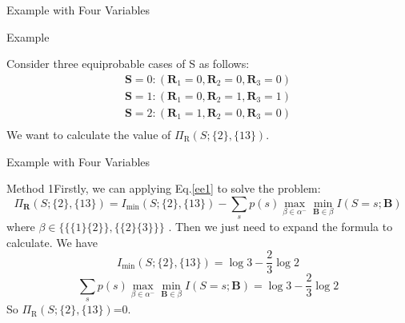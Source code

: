 \begin{frame}{Example with Four Variables}
\begin{block}{Example}

 Consider three equiprobable cases of S as follows:
\[
\begin{array}{c}
\mathbf{S}=0: (\mathbf{R}_1=0,\mathbf{R}_2=0,\mathbf{R}_3=0)\\
\mathbf{S}=1: (\mathbf{R}_1=0,\mathbf{R}_2=1,\mathbf{R}_3=1)\\
\mathbf{S}=2: (\mathbf{R}_1=1,\mathbf{R}_2=0,\mathbf{R}_3=0)\\
\end{array}
\]
We want to calculate the value of $\Pi_{\mathrm{R}}(S ; \{2\},\{13\})$.
\end{block}

\end{frame}
\begin{frame}{Example with Four Variables}
\begin{block}{Method 1}Firstly, we can applying Eq.\ref{ee1}  to solve the problem:
\begin{equation}\Pi_{\mathbf{R}}(S ;\{2\},\{13\})=I_{\min }(S ; \{2\},\{13\})-\sum_{s} p(s) \max _{\beta \in \alpha^{-}} \min _{\mathbf{B} \in \beta} I(S=s ; \mathbf{B})\label{43}\end{equation} 
where $\beta \in\{\{\{1\}\{2\}\},\{\{2\}\{3\}\}\} $ . 
 Then we just need to expand the formula to calculate. We have
\begin{equation}I_{\min }(S ; \{2\},\{13\})=\log3 -\frac{2}{3} \log 2\end{equation}
\begin{equation}\sum_{s} p(s) \max _{\beta \in \alpha^{-}} \min _{\mathbf{B} \in \beta} I(S=s ; \mathbf{B})=\log3 -\frac{2}{3} \log 2\end{equation}
So $\Pi_{\mathrm{R}}(S ; \{2\},\{13\})$=0.
\end{block}


\end{frame}
